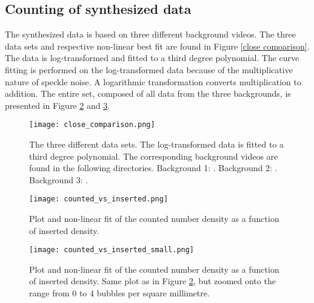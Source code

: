 \clearpage
\subsection{Counting of synthesized data}
The synthesized data is based on three different background videos. The three data sets and respective non-linear best fit are found in Figure \ref{close comoarison}. The data is log-transformed and fitted to a third degree polynomial. The curve fitting is performed on the log-transformed data because of the multiplicative nature of speckle noise. A logarithmic transformation converts multiplication to addition. The entire set, composed of all data from the three backgrounds, is presented in Figure \ref{Fig:counted_vs_inserted_all} and \ref{Fig:counted_vs_inserted_all_small}.
\begin{figure}[h]
  \centering
  \texttt{[image: close\_comparison.png]}
  \cprotect\caption{The three different data sets. The log-transformed data is fitted to a third degree polynomial. The corresponding background videos are found in the following directories. Background 1: . Background 2: . Background 3: .}
  \label{Fig:close comparison}
\end{figure}

\begin{figure}[h]
  \centering
  \texttt{[image: counted\_vs\_inserted.png]}
  \caption{Plot and non-linear fit of the counted number density as a function of inserted density.}
  \label{Fig:counted_vs_inserted_all}
\end{figure}


\begin{figure}[h]
  \centering
  \texttt{[image: counted\_vs\_inserted\_small.png]}
  \caption{Plot and non-linear fit of the counted number density as a function of inserted density. Same plot as in Figure \ref{Fig:counted_vs_inserted_all}, but zoomed onto the range from 0 to 4 bubbles per square millimetre.}
  \label{Fig:counted_vs_inserted_all_small}
\end{figure}

